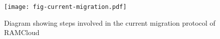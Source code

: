 \begin{figure}[t]
\texttt{[image: fig-current-migration.pdf]}
\caption{Diagram showing steps involved in the current migration protocol of RAMCloud}
\label{fig:migration-current}
\end{figure}

